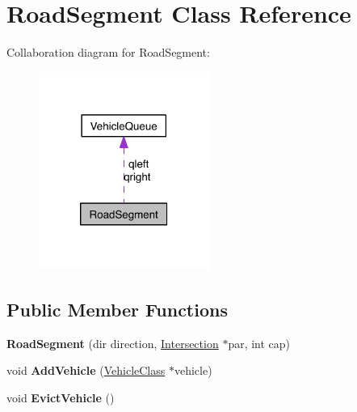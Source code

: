 \hypertarget{class_road_segment}{\section{Road\-Segment Class Reference}
\label{class_road_segment}
}


Collaboration diagram for Road\-Segment\-:\nopagebreak
\begin{figure}[H]
\begin{center}
\leavevmode
\includegraphics[width=158pt]{class_road_segment__coll__graph}
\end{center}
\end{figure}
\subsection*{Public Member Functions}
\begin{DoxyCompactItemize}
\item 
\hypertarget{class_road_segment_ab7caf1e5f213f7584687edce88a17cdd}{{\bfseries Road\-Segment} (dir direction, \hyperlink{class_intersection}{Intersection} $\ast$par, int cap)}\label{class_road_segment_ab7caf1e5f213f7584687edce88a17cdd}

\item 
\hypertarget{class_road_segment_a86d7460856feadb6faa86e130b090479}{void {\bfseries Add\-Vehicle} (\hyperlink{class_vehicle_class}{Vehicle\-Class} $\ast$vehicle)}\label{class_road_segment_a86d7460856feadb6faa86e130b090479}

\item 
\hypertarget{class_road_segment_a9ca3951ccd16a925d6aad11ff97f6591}{void {\bfseries Evict\-Vehicle} ()}\label{class_road_segment_a9ca3951ccd16a925d6aad11ff97f6591}

\end{DoxyCompactItemize}
